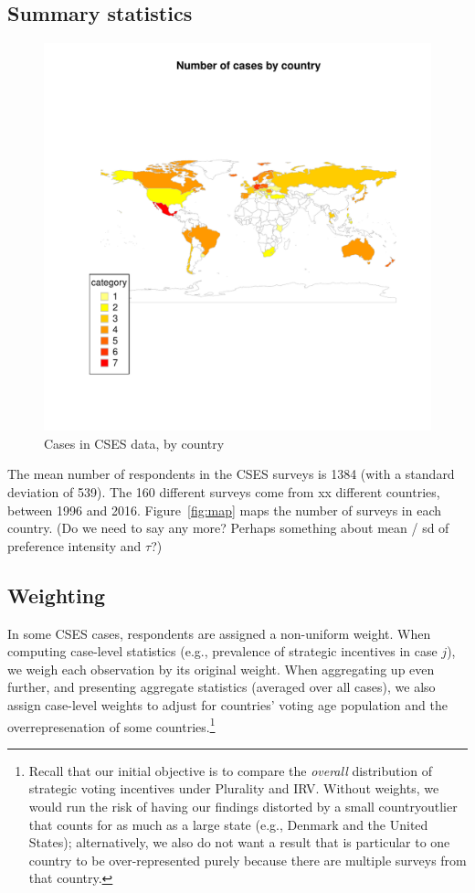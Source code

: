 \documentclass[12pt, letter]{article}
\begin{document}
\subsection{Summary statistics}

\begin{figure}[!htb]
	\centering
	\includegraphics[width = .5 \textwidth]{../output/figures/case_map.pdf}
	\caption{Cases in CSES data, by country}
	\label{fig:case_map}
\end{figure}

The mean number of respondents in the CSES surveys is 1384 (with a standard deviation of 539). The 160 different surveys come from xx different countries, between 1996 and 2016. Figure~\ref{fig:map} maps the number of surveys in each country. (Do we need to say any more? Perhaps something about mean / sd of preference intensity and $\tau$?)

\subsection{Weighting}

In some CSES cases, respondents are assigned a non-uniform weight. When computing case-level statistics (e.g., prevalence of strategic incentives in case $j$), we weigh each observation by its original weight. When aggregating up even further, and presenting aggregate statistics (averaged over all cases), we also assign case-level weights to adjust for countries' voting age population and the overrepresenation of some countries.\footnote{Recall that our initial objective is to compare the \textit{overall} distribution of strategic voting incentives under Plurality and IRV. Without weights, we would run the risk of having our findings distorted by a small countryoutlier that counts for as much as a large state (e.g., Denmark and the United States); alternatively, we also do not want a result that is particular to one country to be over-represented purely because there are multiple surveys from that country.}
\end{document}
